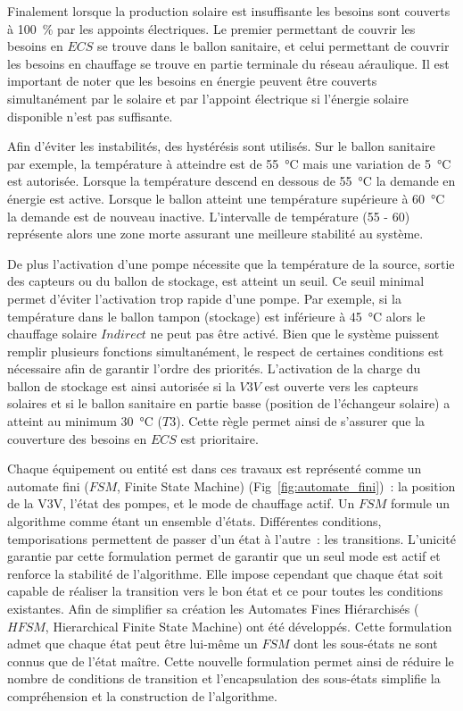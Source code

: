 Finalement lorsque la production solaire est insuffisante les besoins sont couverts à
\SI{100}{\percent} par les appoints électriques. Le premier permettant de couvrir les
besoins en $ECS$ se trouve dans le ballon sanitaire, et celui permettant de couvrir les
besoins en chauffage se trouve en partie terminale du réseau aéraulique. Il est important
de noter que les besoins en énergie peuvent être couverts simultanément par
le solaire et par l’appoint électrique si l’énergie solaire disponible n’est pas
suffisante.

Afin d’éviter les instabilités, des hystérésis sont utilisés. Sur le ballon sanitaire par
exemple, la température à atteindre est de \SI{55}{\celsius} mais une variation de
\SI{5}{\celsius} est autorisée. Lorsque la température descend en dessous de
\SI{55}{\celsius} la demande en énergie est active. Lorsque le ballon atteint une
température supérieure à \SI{60}{\celsius} la demande est de nouveau inactive.
L’intervalle de température (55 - 60) représente alors une zone morte assurant une
meilleure stabilité au système.

De plus l’activation d’une pompe nécessite que la température de la source, sortie des
capteurs ou du ballon de stockage, est atteint un seuil. Ce seuil minimal permet d’éviter
l’activation trop rapide d’une pompe. Par exemple, si la température dans le ballon tampon
(stockage) est inférieure à \SI{45}{\celsius} alors le chauffage solaire $Indirect$ ne
peut pas être activé. Bien que le système puissent remplir plusieurs fonctions
simultanément, le respect de certaines conditions est nécessaire afin de garantir l’ordre
des priorités. L’activation de la charge du ballon de stockage est ainsi autorisée si la
$V3V$ est ouverte vers les capteurs solaires et si le ballon sanitaire en partie
basse (position de l’échangeur solaire) a atteint au minimum \SI{30}{\celsius} ($T3$). Cette
règle permet ainsi de s’assurer que la couverture des besoins en $ECS$ est prioritaire.

Chaque équipement ou entité est dans ces travaux est représenté comme un automate fini
($FSM$, Finite State Machine) (Fig~\ref{fig:automate_fini})~: la position de la V3V,
l’état des pompes, et le mode de chauffage actif. Un $FSM$ formule un algorithme comme
étant un ensemble d’états. Différentes conditions, temporisations permettent de passer
d’un état à l’autre~: les transitions. L’unicité garantie par cette formulation permet de
garantir que un seul mode est actif et renforce la stabilité de l’algorithme. Elle impose
cependant que chaque état soit capable de réaliser la transition vers le bon état et ce
pour toutes les conditions existantes. Afin de simplifier sa création les Automates Fines
Hiérarchisés ($HFSM$, Hierarchical Finite State Machine) ont été développés. Cette
formulation admet que chaque état peut être lui-même un $FSM$ dont les sous-états ne sont
connus que de l’état maître. Cette nouvelle formulation permet ainsi de réduire le nombre
de conditions de transition et l’encapsulation des sous-états simplifie la compréhension
et la construction de l’algorithme.

